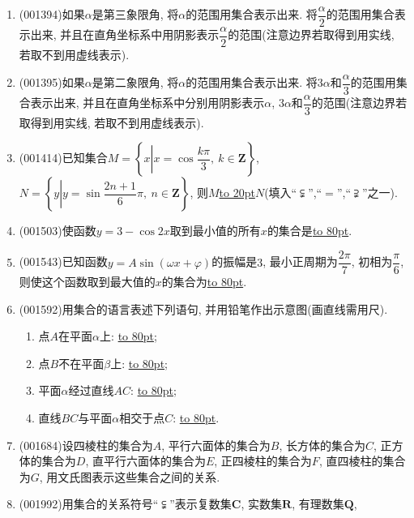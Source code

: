 \documentclass[10pt,a4paper]{article}
\newcommand{\blank}[1]{\underline{\hbox to #1pt{}}}
\begin{document}
\begin{enumerate}[1.]
\begin{enumerate}[(1)]
\item 若角$\alpha$与角$\beta$的终边关于角$\dfrac{\pi}{5}$的终边所在直线对称, 则角$\alpha$与角$\beta$ 满足的关系式为\blank{80}.\\ 
\end{enumerate}
\item {\tiny (001394)}如果$\alpha$是第三象限角, 将$\alpha$的范围用集合表示出来. 将$\dfrac{\alpha}{2}$的范围用集合表示出来, 并且在直角坐标系中用阴影表示$\dfrac{\alpha}{2}$的范围(注意边界若取得到用实线, 若取不到用虚线表示).
\item {\tiny (001395)}如果$\alpha$是第二象限角, 将$\alpha$的范围用集合表示出来. 将$3\alpha$和$\dfrac{\alpha}{3}$的范围用集合表示出来, 并且在直角坐标系中分别用阴影表示$\alpha$, $3\alpha$和$\dfrac{\alpha}{3}$的范围(注意边界若取得到用实线, 若取不到用虚线表示).
\item {\tiny (001414)}已知集合$M=\left\{x\left|x=\cos\dfrac{k\pi}{3}, \ k \in \mathbf{Z}\right.\right\}$, $N=\left\{y\left|y=\sin\dfrac{2n+1}{6}\pi,\ n \in \mathbf{Z}\right.\right\}$, 则$M$\blank{20}$N$(填入``$\subsetneqq$'',``$=$'',``$\supsetneqq$''之一).
\item {\tiny (001503)}使函数$y=3-\cos 2x$取到最小值的所有$x$的集合是\blank{80}.
\item {\tiny (001543)}已知函数$y=A\sin(\omega x+\varphi)$的振幅是$3$, 最小正周期为$\dfrac{2\pi}{7}$,
初相为$\dfrac{\pi}{6}$, 则使这个函数取到最大值的$x$的集合为\blank{80}.
\item {\tiny (001592)}用集合的语言表述下列语句, 并用铅笔作出示意图(画直线需用尺).
\begin{enumerate}[(1)]
\item 点$A$在平面$\alpha$上: \blank{80};\\ 
\item 点$B$不在平面$\beta$上: \blank{80};\\ 
\item 平面$\alpha$经过直线$AC$: \blank{80};\\ 
\item 直线$BC$与平面$\alpha$相交于点$C$: \blank{80}.\\ 
\end{enumerate}
\item {\tiny (001684)}设四棱柱的集合为$A$, 平行六面体的集合为$B$, 长方体的集合为$C$, 正方体的集合为$D$,
直平行六面体的集合为$E$, 正四棱柱的集合为$F$, 直四棱柱的集合为$G$, 用文氏图表示这些集合之间的关系.
\item {\tiny (001992)}用集合的关系符号``$\subsetneqq$''表示复数集$\mathbf{C}$, 实数集$\mathbf{R}$, 有理数集$\mathbf{Q}$,

\end{enumerate}
\end{document}
